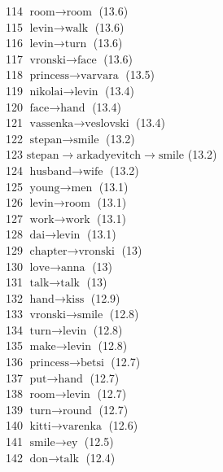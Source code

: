 \begin{appendices}
   114  $ \text{room} \to \text{room} $ (13.6) \\
   115  $ \text{levin} \to \text{walk} $ (13.6) \\
   116  $ \text{levin} \to \text{turn} $ (13.6) \\
   117  $ \text{vronski} \to \text{face} $ (13.6) \\
   118  $ \text{princess} \to \text{varvara} $ (13.5) \\
   119  $ \text{nikolai} \to \text{levin} $ (13.4) \\
   120  $ \text{face} \to \text{hand} $ (13.4) \\
   121  $ \text{vassenka} \to \text{veslovski} $ (13.4) \\
   122  $ \text{stepan} \to \text{smile} $ (13.2) \\
   123  $ \text{stepan} \to \text{arkadyevitch} \to \text{smile} $ (13.2) \\
   124  $ \text{husband} \to \text{wife} $ (13.2) \\
   125  $ \text{young} \to \text{men} $ (13.1) \\
   126  $ \text{levin} \to \text{room} $ (13.1) \\
   127  $ \text{work} \to \text{work} $ (13.1) \\
   128  $ \text{dai} \to \text{levin} $ (13.1) \\
   129  $ \text{chapter} \to \text{vronski} $ (13) \\
   130  $ \text{love} \to \text{anna} $ (13) \\
   131  $ \text{talk} \to \text{talk} $ (13) \\
   132  $ \text{hand} \to \text{kiss} $ (12.9) \\
   133  $ \text{vronski} \to \text{smile} $ (12.8) \\
   134  $ \text{turn} \to \text{levin} $ (12.8) \\
   135  $ \text{make} \to \text{levin} $ (12.8) \\
   136  $ \text{princess} \to \text{betsi} $ (12.7) \\
   137  $ \text{put} \to \text{hand} $ (12.7) \\
   138  $ \text{room} \to \text{levin} $ (12.7) \\
   139  $ \text{turn} \to \text{round} $ (12.7) \\
   140  $ \text{kitti} \to \text{varenka} $ (12.6) \\
   141  $ \text{smile} \to \text{ey} $ (12.5) \\
   142  $ \text{don} \to \text{talk} $ (12.4) \\

\end{appendices}
